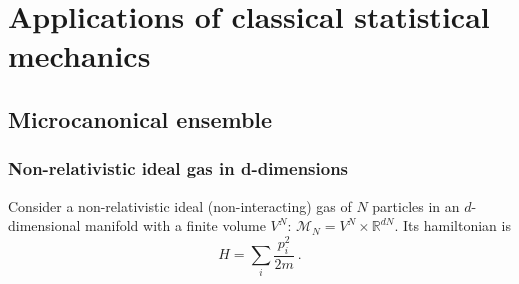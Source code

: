 \part{Applications of classical statistical mechanics}

\chapter{Microcanonical ensemble}

\section{Non-relativistic ideal gas in d-dimensions}

    Consider a non-relativistic ideal (non-interacting) gas of $N$ particles in an $d$-dimensional manifold with a finite volume $V^N$: $\mathcal M_N = V^N \times \mathbb R^{dN}$. Its hamiltonian is 
    \begin{equation*}
        H = \sum_i \frac{p^2_i}{2m} ~.
    \end{equation*}

